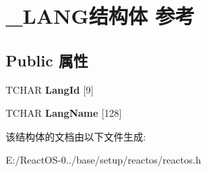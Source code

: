 \hypertarget{struct___l_a_n_g}{}\section{\+\_\+\+L\+A\+N\+G结构体 参考}
\label{struct___l_a_n_g}
\subsection*{Public 属性}
\begin{DoxyCompactItemize}
\item 
\mbox{\label{struct___l_a_n_g_aaaa647d69561b3afbf2d3acd36041ff6}} 
T\+C\+H\+AR {\bfseries Lang\+Id} \mbox{[}9\mbox{]}
\item 
\mbox{\label{struct___l_a_n_g_aaf755f35947c7dacc79a272cd4553e34}} 
T\+C\+H\+AR {\bfseries Lang\+Name} \mbox{[}128\mbox{]}
\end{DoxyCompactItemize}


该结构体的文档由以下文件生成\+:\begin{DoxyCompactItemize}
\item 
E\+:/\+React\+O\+S-\/0../base/setup/reactos/reactos.\+h\end{DoxyCompactItemize}
